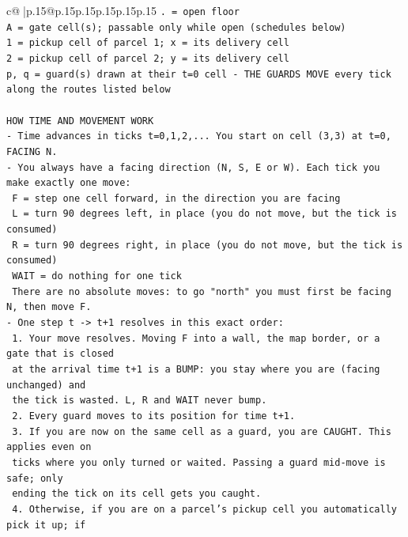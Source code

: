 \documentclass{article}
\begin{document}
{\begin{supertabular}{c@{$\;$}|p{.15\linewidth}@{}p{.15\linewidth}p{.15\linewidth}p{.15\linewidth}p{.15\linewidth}p{.15\linewidth}}
{{{\texttt{. = open floor} \\
\texttt{A = gate cell(s); passable only while open (schedules below)} \\
\texttt{1 = pickup cell of parcel 1; x = its delivery cell} \\
\texttt{2 = pickup cell of parcel 2; y = its delivery cell} \\
\texttt{p, q = guard(s) drawn at their t=0 cell {-} THE GUARDS MOVE every tick along the routes listed below} \\
\\ 
\texttt{HOW TIME AND MOVEMENT WORK} \\
\texttt{{-} Time advances in ticks t=0,1,2,... You start on cell (3,3) at t=0, FACING N.} \\
\texttt{{-} You always have a facing direction (N, S, E or W). Each tick you make exactly one move:} \\
\texttt{  F    = step one cell forward, in the direction you are facing} \\
\texttt{  L    = turn 90 degrees left, in place (you do not move, but the tick is consumed)} \\
\texttt{  R    = turn 90 degrees right, in place (you do not move, but the tick is consumed)} \\
\texttt{  WAIT = do nothing for one tick} \\
\texttt{  There are no absolute moves: to go "north" you must first be facing N, then move F.} \\
\texttt{{-} One step t {-}> t+1 resolves in this exact order:} \\
\texttt{  1. Your move resolves. Moving F into a wall, the map border, or a gate that is closed} \\
\texttt{     at the arrival time t+1 is a BUMP: you stay where you are (facing unchanged) and} \\
\texttt{     the tick is wasted. L, R and WAIT never bump.} \\
\texttt{  2. Every guard moves to its position for time t+1.} \\
\texttt{  3. If you are now on the same cell as a guard, you are CAUGHT. This applies even on} \\
\texttt{     ticks where you only turned or waited. Passing a guard mid{-}move is safe; only} \\
\texttt{     ending the tick on its cell gets you caught.} \\
\texttt{  4. Otherwise, if you are on a parcel's pickup cell you automatically pick it up; if} \\
}}}
\end{supertabular}}
\end{document}
